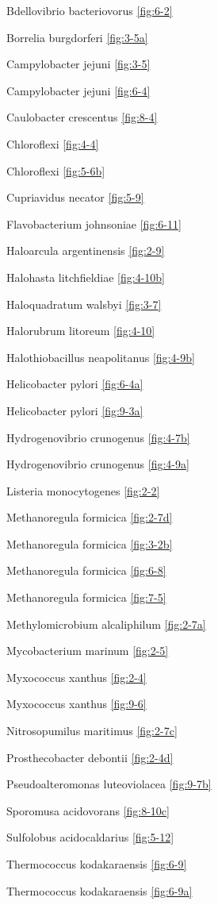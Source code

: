 \documentclass[]{tufte-book}
\begin{document}
Bdellovibrio bacteriovorus \ref{fig:6-2}

Borrelia burgdorferi \ref{fig:3-5a}

Campylobacter jejuni \ref{fig:3-5}

Campylobacter jejuni \ref{fig:6-4}

Caulobacter crescentus \ref{fig:8-4}

Chloroflexi \ref{fig:4-4}

Chloroflexi \ref{fig:5-6b}

Cupriavidus necator \ref{fig:5-9}

Flavobacterium johnsoniae \ref{fig:6-11}

Haloarcula argentinensis \ref{fig:2-9}

Halohasta litchfieldiae \ref{fig:4-10b}

Haloquadratum walsbyi \ref{fig:3-7}

Halorubrum litoreum \ref{fig:4-10}

Halothiobacillus neapolitanus \ref{fig:4-9b}

Helicobacter pylori \ref{fig:6-4a}

Helicobacter pylori \ref{fig:9-3a}

Hydrogenovibrio crunogenus \ref{fig:4-7b}

Hydrogenovibrio crunogenus \ref{fig:4-9a}

Listeria monocytogenes \ref{fig:2-2}

Methanoregula formicica \ref{fig:2-7d}

Methanoregula formicica \ref{fig:3-2b}

Methanoregula formicica \ref{fig:6-8}

Methanoregula formicica \ref{fig:7-5}

Methylomicrobium alcaliphilum \ref{fig:2-7a}

Mycobacterium marinum \ref{fig:2-5}

Myxococcus xanthus \ref{fig:2-4}

Myxococcus xanthus \ref{fig:9-6}

Nitrosopumilus maritimus \ref{fig:2-7c}

Prosthecobacter debontii \ref{fig:2-4d}

Pseudoalteromonas luteoviolacea \ref{fig:9-7b}

Sporomusa acidovorans \ref{fig:8-10c}

Sulfolobus acidocaldarius \ref{fig:5-12}

Thermococcus kodakaraensis \ref{fig:6-9}

Thermococcus kodakaraensis \ref{fig:6-9a}
\end{document}
